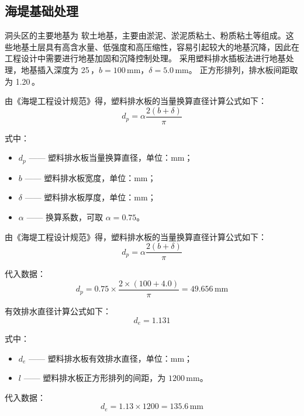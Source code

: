 \documentclass[UTF8, a4paper, 12pt]{ctexart} %
\begin{document}
\subsection{海堤基础处理}
洞头区的主要地基为 软土地基，主要由淤泥、淤泥质粘土、粉质粘土等组成。这些地基土层具有高含水量、低强度和高压缩性，容易引起较大的地基沉降，因此在工程设计中需要进行地基加固和沉降控制处理。
采用塑料排水插板法进行地基处理，地基插入深度为 25\,，$b=100\,\text{mm}$，$\delta=5.0\,\text{mm}$。  
正方形排列，排水板间距取为 1.20\,。

由《海堤工程设计规范》得，塑料排水板的当量换算直径计算公式如下：
\begin{equation}
    d_p = \alpha \frac{2(b + \delta)}{\pi}
\end{equation}

式中：
\begin{itemize}
    \item $d_p$ —— 塑料排水板当量换算直径，单位：$\text{mm}$；
    \item $b$ —— 塑料排水板宽度，单位：$\text{mm}$；
    \item $\delta$ —— 塑料排水板厚度，单位：$\text{mm}$；
    \item $\alpha$ —— 换算系数，可取 $\alpha = 0.75$。
\end{itemize}
由《海堤工程设计规范》得，塑料排水板的当量换算直径计算公式如下：
\begin{equation}
    d_p = \alpha \frac{2(b + \delta)}{\pi}
\end{equation}

代入数据：
\begin{equation}
    d_p = 0.75 \times \frac{2 \times (100 + 4.0)}{\pi} = 49.656\,\text{mm}
\end{equation}

有效排水直径计算公式如下：
\begin{equation}
    d_e = 1.131
\end{equation}

式中：
\begin{itemize}
    \item $d_e$ —— 塑料排水板有效排水直径，单位：$\text{mm}$；
    \item $l$ —— 塑料排水板正方形排列的间距，为 $1200\,\text{mm}$。
\end{itemize}

代入数据：
\begin{equation}
    d_e = 1.13 \times 1200 = 135.6\,\text{mm}
\end{equation}
\end{document}
